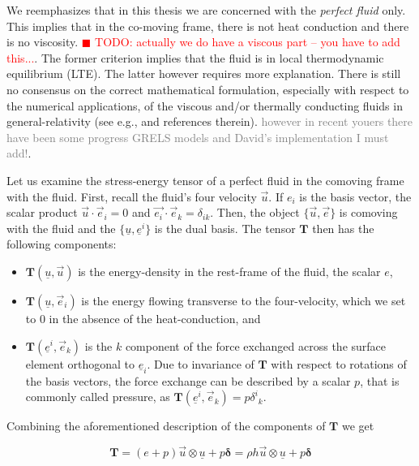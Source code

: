 \documentclass[11pt,a4paper,headinclude=true,DIV=14,BCOR=8mm,chapterprefix,listof=totoc,twoside,openright,abstracton]{scrbook}
\newcommand{\todo}[1]{\textcolor{red}{$\blacksquare$ TODO: #1}}
\begin{document}
We reemphasizes that in this thesis we are concerned with the \textit{perfect fluid} only. This implies that in the co-moving frame, there is not heat conduction and there is no viscosity. \todo{actually we do have a viscous part -- you have to add this...}. The former criterion implies that the fluid is in local thermodynamic equilibrium (LTE). The latter however requires more explanation. There is still no consensus on the correct mathematical formulation, especially with respect to the numerical applications, of the viscous and/or thermally conducting fluids in general-relativity (see e.g., \cite{Andersson:2006nr} and references therein). \textcolor{gray}{however in recent youers there have been some progress GRELS models and David's implementation I must add!}. 

Let us examine the stress-energy tensor of a perfect fluid in the comoving frame with the fluid. First, recall the fluid's four velocity $\vec{u}$. If $e_{i}$ is the basis vector, the scalar product $\vec{u}\cdot\vec{e}_i=0$ and $\vec{e_i}\cdot\vec{e}_k = \delta_{ik}$. Then, the object $\{\vec{u},\vec{e}\}$ is comoving with the fluid and the $\{\underline{u},\underline{e}^i\}$ is the dual basis. The tensor $\boldsymbol{T}$ then has the following components: 

\begin{itemize}
    \item $\boldsymbol{T}(\underline{u}, \vec{u})$ is the energy-density in the rest-frame of the fluid, the scalar $e$,
    \item $\boldsymbol{T}(\underline{u}, \vec{e}_i)$ is the energy flowing transverse to the four-velocity, which we set to $0$ in the absence of the heat-conduction, and
    \item $\boldsymbol{T}(\underline{e}^i, \vec{e}_k)$ is the $k$ component of the force exchanged across the surface element orthogonal to $\underline{e}_i$. Due to invariance of $\boldsymbol{T}$ with respect to rotations of the basis vectors, the force exchange can be described by a scalar $p$, that is commonly called pressure, as $\boldsymbol{T}(\underline{e}^i,\vec{e}_k) = p {\delta^i}_k$.
\end{itemize}

Combining the aforementioned description of the components of $\boldsymbol{T}$ we get

\begin{equation}
\boldsymbol{T} = (e + p)\vec{u}\otimes \underline{u} + p\boldsymbol{\delta} = \rho h \vec{u}\otimes\underline{u} + p\boldsymbol{\delta}
\label{eq:theory:stressenergytensor}
\end{equation}
\end{document}
